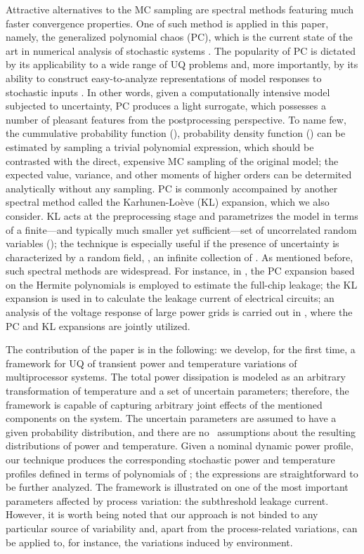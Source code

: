 Attractive alternatives to the MC sampling are spectral methods \cite{xiu2010, maitre2010, ghanem1991} featuring much faster convergence properties. One of such method is applied in this paper, namely, the generalized polynomial chaos (PC), which is the current state of the art in numerical analysis of stochastic systems \cite{xiu2010}. The popularity of PC is dictated by its applicability to a wide range of UQ problems and, more importantly, by its ability to construct easy-to-analyze representations of model responses to stochastic inputs \cite{eldred2009}. In other words, given a computationally intensive model subjected to uncertainty, PC produces a light surrogate, which possesses a number of pleasant features from the postprocessing perspective. To name few, the cummulative probability function (\cdf), probability density function (\pdf) can be estimated by sampling a trivial polynomial expression, which should be contrasted with the direct, expensive MC sampling of the original model; the expected value, variance, and other moments of higher orders can be determited analytically without any sampling. PC is commonly accompained by another spectral method called the Karhunen-Lo\`{e}ve (KL) expansion, which we also consider. KL acts at the preprocessing stage and parametrizes the model in terms of a finite---and typically much smaller yet sufficient---set of uncorrelated random variables (\rvs); the technique is especially useful if the presence of uncertainty is characterized by a random field, \ie, an infinite collection of \rvs. As mentioned before, such spectral methods are widespread. For instance, in \cite{shen2009}, the PC expansion based on the Hermite polynomials is employed to estimate the full-chip leakage; the KL expansion is used in \cite{bhardwaj2006} to calculate the leakage current of electrical circuits; an analysis of the voltage response of large power grids is carried out in \cite{ghanta2006}, where the PC and KL expansions are jointly utilized.

The contribution of the paper is in the following: we develop, for the first time, a framework for UQ of transient power and temperature variations of multiprocessor systems. The total power dissipation is modeled as an arbitrary transformation of temperature and a set of uncertain parameters; therefore, the framework is capable of capturing arbitrary joint effects of the mentioned components on the system. The uncertain parameters are assumed to have a given probability distribution, and there are no \apriori\ assumptions about the resulting distributions of power and temperature. Given a nominal dynamic power profile, our technique produces the corresponding stochastic power and temperature profiles defined in terms of polynomials of \rvs; the expressions are straightforward to be further analyzed. The framework is illustrated on one of the most important parameters affected by process variation: the subthreshold leakage current. However, it is worth being noted that our approach is not binded to any particular source of variability and, apart from the process-related variations, can be applied to, for instance, the variations induced by environment.

